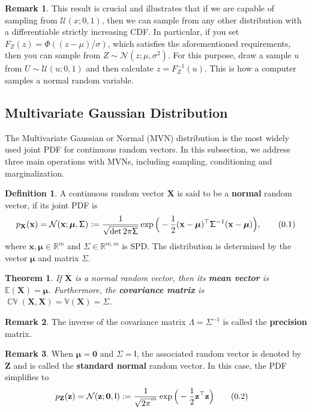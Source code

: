 \documentclass[10pt]{article}
\newtheorem{thm}{Theorem}[section]
\theoremstyle{definition}
\newtheorem{defn}{Definition}[section]
\newtheorem*{rem}{Remark}
\newcommand\eqnum{\addtocounter{equation}{1}\tag{\arabic{section}.\arabic{equation}}}
\DeclareMathOperator{\cov}{\mathbb{CV}}
\begin{document}
\newline
\begin{rem}
This result is crucial and illustrates that if we are capable of sampling from $\mathcal{U}(x; 0, 1)$, then we can sample from any other distribution with a differentiable strictly increasing CDF. In particular, if you set $F_Z(z) = \Phi((z-\mu)/\sigma)$, which satisfies the aforementioned requirements, then you can sample from $Z\sim\mathcal{N}(z; \mu, \sigma^2)$. For this purpose, draw a sample $u$ from $U\sim\mathcal{U}(u; 0, 1)$ and then calculate $z=F_Z^{-1}(u)$. This is how a computer samples a normal random variable.
\end{rem}

\subsection{Multivariate Gaussian Distribution}
The Multivariate Gaussian or Normal (MVN) distribution is the most widely used joint PDF for continuous random vectors. In this subsection, we address three main operations with MVNs, including sampling, conditioning and marginalization.
\begin{defn}
A continuous random vector $\mathbf{X}$ is said to be a \textbf{normal} random vector, if its joint PDF is
\begin{equation*}
p_{\mathbf{X}}(\mathbf{x}) = \mathcal{N}(\mathbf{x};\boldsymbol{\mu},\mathsf{\Sigma}) := 
\frac{1}{\sqrt{\det2\pi\mathsf{\Sigma}}}
\exp\Big(-\frac{1}{2}(\mathbf{x} - \boldsymbol{\mu})^{\top}\mathsf{\Sigma}^{-1}(\mathbf{x} - \boldsymbol{\mu})\Big),
\eqnum
\end{equation*}
where $\mathbf{x}, \boldsymbol{\mu} \in \mathbb{R}^m$ and $\mathsf{\Sigma} \in \mathbb{R}^{m,m}$ is SPD. The distribution is determined by the vector $\boldsymbol{\mu}$ and matrix $\mathsf{\Sigma}$. 
\end{defn}
\begin{thm}
If $\mathbf{X}$ is a normal random vector, then its \textbf{mean vector} is $\mathbb{E}(\mathbf{X})=\boldsymbol{\mu}$. Furthermore, the \textbf{covariance matrix} is $\cov(\mathbf{X}, \mathbf{X})=\mathbb{V}(\mathbf{X})=\mathsf{\Sigma}$.
\end{thm}
\begin{rem}
The inverse of the covariance matrix $\mathsf{\Lambda} = \mathsf{\Sigma}^{-1}$ is called the \textbf{precision} matrix.
\end{rem}
\begin{rem}
When $\boldsymbol{\mu} = \mathbf{0}$ and $\mathsf{\Sigma} = \mathsf{I}$, the associated random vector is denoted by $\mathbf{Z}$ and is called the \textbf{standard normal}  random vector. In this case, the PDF simplifies to
\begin{align*}
p_{\mathbf{Z}}(\mathbf{z}) &=  \mathcal{N}(\mathbf{z};\boldsymbol{0},\mathsf{I}) := \frac{1}{\sqrt{2\pi}^m}
\exp\Big(-\frac{1}{2}\mathbf{z}^{\top}\mathbf{z}\Big)
\eqnum
\end{align*}
\end{rem}
\end{document}
